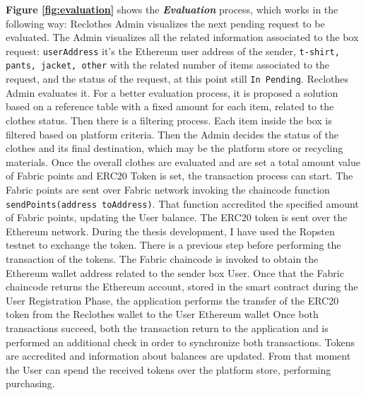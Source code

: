 \begin{outline}[enumerate]
    \1 \textbf{Figure \ref{fig:evaluation}} shows the \textit{\bf{Evaluation}} process, which works in the following way:
    \2 Reclothes Admin visualizes the next pending request to be evaluated. The Admin visualizes all the related information
    associated to the box request: \texttt{userAddress} it's the Ethereum user address of the sender, 
    \texttt{t-shirt, pants, jacket, other} with the related number of items associated to the request,
    and the status of the request, at this point still \texttt{In Pending}.
    \2 Reclothes Admin evaluates it. For a better evaluation process, it is proposed a solution based on a reference table 
    with a fixed amount for each item, related to the clothes status. Then there is a filtering process. Each item 
    inside the box is filtered based on platform criteria. Then the Admin decides the status of the clothes and its 
    final destination, which may be the platform store or recycling materials. Once the overall clothes are 
    evaluated and are set a total amount value of Fabric points and ERC20 Token is set, the transaction process can start.
    \3 The Fabric points are sent over Fabric network invoking the chaincode function \texttt{sendPoints(address toAddress)}.
    That function accredited the specified amount of Fabric points, updating the User balance. 
    \3 The ERC20 token is sent over the Ethereum network. During the thesis development, I have used the Ropsten testnet 
    to exchange the token. There is a previous step before performing the transaction of the tokens. The Fabric 
    chaincode is invoked to obtain the Ethereum wallet address related to the sender box User. Once that the Fabric 
    chaincode returns the Ethereum account, stored in the smart contract during the User Registration Phase, the 
    application performs the transfer of the ERC20 token from the Reclothes wallet to the User Ethereum wallet
    \2 Once both transactions succeed, both the transaction return to the application and is performed
    an additional check in order to synchronize both transactions. Tokens are accredited and 
    information about balances are updated. From that moment the User can spend the received
    tokens over the platform store, performing purchasing. 


\end{outline}
